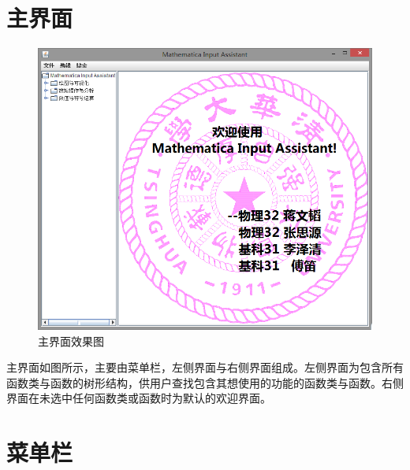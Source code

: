 \documentclass[hyperref, UTF8
,bookmarksnumbered=true, oneside]{ctexbook}
\begin{document}
	\section{主界面} %

		\begin{figure}[!h]
			\centering
			\includegraphics[width=5in]{Welcome.png}
			\caption{主界面效果图}	
		\end{figure}

		主界面如图所示，主要由菜单栏，左侧界面与右侧界面组成。左侧界面为包含所有函数类与函数的树形结构，供用户查找包含其想使用的功能的函数类与函数。右侧界面在未选中任何函数类或函数时为默认的欢迎界面。
		
	\section{菜单栏} %
\end{document}
